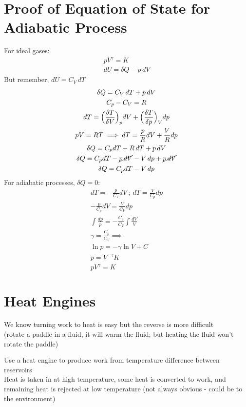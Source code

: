 \documentclass[a4paper, 11pt, normalem]{report}
\begin{document}
\section{Proof of Equation of State for Adiabatic Process}
For ideal gases:
\begin{gather*}
    pV^{\gamma} = K \\
    dU = \delta Q - p\,dV
\end{gather*}
But remember, $dU = C_V \, dT$
\begin{gather*}
    \delta Q = C_V \, dT + p\,dV \\
    C_p - C_V = R \\
    dT = \Big(\frac{\delta T}{\delta V} \Big)_p dV + \Big(\frac{\delta T}{\delta p} \Big)_V dp \\
    pV = RT \implies dT = \frac{p}{R}dV + \frac{V}{R}dp \\
    \delta Q = C_p dT - R\,dT + p\,dV \\
    \delta Q = C_p dT - \cancel{p\,dV} - V\,dp + \cancel{p\,dV} \\
    \delta Q = C_p dT - V\,dp
\end{gather*}
For adiabatic processes, $\delta Q = 0$:
\begin{gather*}
    dT = -\frac{p}{C_V}dV ~;~ dT = \frac{V}{C_p}dp \\
    -\frac{p}{C_p}dV = \frac{V}{C_V}dp \\
    \int \frac{dp}{p} = -\frac{C_p}{C_V}\int \frac{dV}{V} \\
    \gamma = \frac{C_p}{C_V} \implies \\
    \ln p = -\gamma \ln V + C \\
    p = V^{-\gamma}K \\
    pV^{\gamma} = K
\end{gather*}

\section{Heat Engines}
We know turning work to heat is easy but the reverse is more difficult \\
(rotate a paddle in a fluid, it will warm the fluid; but heating the fluid won't rotate the paddle)

Use a heat engine to produce work from temperature difference between reservoirs \\
Heat is taken in at high temperature, some heat is converted to work, and remaining heat is rejected at low temperature (not always obvious - could be to the environment)
\end{document}
